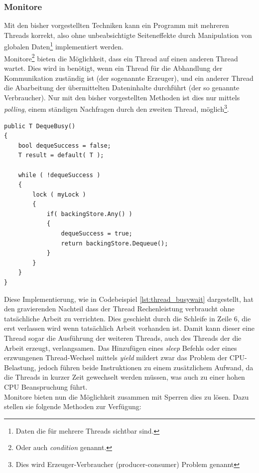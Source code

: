 \subsubsection{Monitore}\label{sss:Monitore}
Mit den bisher vorgestellten Techniken kann ein Programm mit mehreren Threads korrekt, also ohne unbeabsichtigte Seiteneffekte durch Manipulation von globalen Daten\footnote{Daten die für mehrere Threads sichtbar sind.}  implementiert werden. 
\\Monitore\footnote{Oder auch \textit{condition} genannt\parencite[S. 199]{Dahlin2012}.} bieten die Möglichkeit, dass ein Thread auf einen anderen Thread wartet. Dies wird in benötigt, wenn ein Thread für die Abhandlung der Kommunikation zuständig ist (der sogenannte Erzeuger), und ein anderer Thread die Abarbeitung der übermittelten Dateninhalte durchführt (der so genannte Verbraucher). Nur mit den bisher vorgestellten Methoden ist dies nur mittels \textit{polling}, einem ständigen Nachfragen durch den zweiten Thread, möglich\footnote{Dies wird Erzeuger-Verbraucher (producer-consumer) Problem genannt\parencite[S. 188]{tanenbaum2016}}\parencite[S. 199ff]{Dahlin2012}. 
\begin{lstlisting}[caption={Thread naiver Monitor},label={lst:thread_busywait},captionpos=b]
public T DequeBusy()
{
	bool dequeSuccess = false;
	T result = default( T );

	while ( !dequeSuccess )
	{
		lock ( myLock )
		{
			if( backingStore.Any() )
			{
				dequeSuccess = true;
				return backingStore.Dequeue();
			}
		}
	}
}

\end{lstlisting}
Diese Implementierung, wie in Codebeispiel \ref{lst:thread_busywait} dargestellt, hat den gravierenden Nachteil dass der Thread Rechenleistung verbraucht ohne tatsächliche Arbeit zu verrichten. Dies geschieht durch die Schleife in Zeile 6, die erst verlassen wird wenn tatsächlich Arbeit vorhanden ist. Damit kann dieser eine Thread sogar die Ausführung der weiteren Threads, auch des Threads der die Arbeit erzeugt, verlangsamen. Das Hinzufügen eines \textit{sleep} Befehls oder eines erzwungenen Thread-Wechsel mittels \textit{yield} mildert zwar das Problem der CPU-Belastung, jedoch führen beide Instruktionen zu einem zusätzlichem Aufwand, da die Threads in kurzer Zeit gewechselt werden müssen, was auch zu einer hohen CPU Beanspruchung führt.
\\Monitore bieten nun die Möglichkeit zusammen mit Sperren dies zu lösen. Dazu stellen sie folgende Methoden zur Verfügung:\parencite[S. 201]{Dahlin2012}\parencite{ms_monitor}
